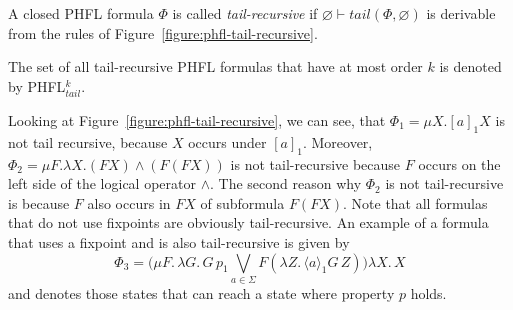 \begin{definition}
    A closed PHFL formula $\Phi$ is called \emph{tail-recursive} if $\varnothing \vdash tail(\Phi, \varnothing)$ is
    derivable from the rules of Figure~\ref{figure:phfl-tail-recursive}.
\end{definition}

The set of all tail-recursive PHFL formulas that have at most order $k$ is denoted by PHFL$^k_{tail}$.

\begin{example}{\cite{lange2014capturing}}
    Looking at Figure~\ref{figure:phfl-tail-recursive}, we can see, that $\Phi_1 = \mu X.[a]_1 X$ is not tail
    recursive, because $X$ occurs under $[a]_1$. Moreover, $\Phi_2 = \mu F .\lambda X. (F X) \wedge (F(F X))$
    is not tail-recursive because $F$ occurs on the left side of the logical operator $\wedge$. The second reason why
    $\Phi_2$ is not tail-recursive is because $F$ also occurs in $F X$ of subformula $F (F X)$. 
    Note that all formulas that do not use fixpoints are obviously tail-recursive. An 
    example of a formula that uses a fixpoint and is also tail-recursive is given by 
    \[\Phi_3 = \big(\mu F.\,\lambda G.\,G\,p_1 \underset{a \in \Sigma}{\bigvee} F (\lambda Z.\,\langle a \rangle_1  G\,Z)\big) \lambda X.\, X\] and denotes those states that can reach a state where property $p$ holds.
\end{example}